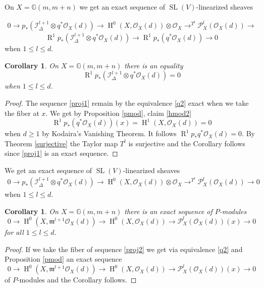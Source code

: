 \documentclass{amsart}
\theoremstyle{plain}
\newtheorem{corollary}[theorem]{Corollary}
\theoremstyle{definition}
\theoremstyle{remark}
\numberwithin{equation}{theorem}
\begin{document}
On $X={\mathbb{G} }(m,m+n)$ we get an exact sequence of ${\operatorname{SL}}(V)$-linearized
sheaves

\begin{align} \label{proj1} 0\rightarrow p_*({\mathcal{I}}_\Delta^{l+1}\otimes
  q^*{\mathcal{O} }_X(d))\rightarrow {\operatorname{H} }^0(X, {\mathcal{O} }_X(d))\otimes {\mathcal{O} }_X \rightarrow^{T^l} {\mathcal{P} }^l_X({\mathcal{O} }_X(d))
\rightarrow \end{align}
\[ {\operatorname{R} }^1p_*({\mathcal{I}}_\Delta^{l+1}\otimes q^*{\mathcal{O} }_X(d)) \rightarrow
{\operatorname{R} }^1p_*(q^*{\mathcal{O} }_X(d)) \rightarrow 0\]
when $1\leq l \leq d$.

\begin{corollary} \label{vanishinggrass} On $X={\mathbb{G} }(m,m+n)$ there is an equality
\[ {\operatorname{R} }^1p_*({\mathcal{I}}_\Delta^{l+1}\otimes q^*{\mathcal{O} }_X(d))=0\]
when $1\leq l \leq d$.
\end{corollary}
\begin{proof} The sequence \ref{proj1} remain by the equivalence
  \ref{q2} exact when we take the fiber at $x$. We get by Proposition
  \ref{pmod}, claim \ref{hmod2}
\[ {\operatorname{R} }^1p_*(q^*{\mathcal{O} }_X(d))(x)={\operatorname{H} }^1(X,{\mathcal{O} }_X(d))=0 \]
when $d\geq 1$ by Kodaira's Vanishing Theorem. It follows ${\operatorname{R} }^1p_*q^*{\mathcal{O} }_X(d)=0$.
By Theorem \ref{surjective}
the Taylor map $T^l$ is surjective and the Corollary follows since
\ref{proj1} is an exact sequence.
\end{proof}

We get an exact sequence of ${\operatorname{SL}}(V)$-linearized sheaves
\begin{align} \label{proj2} 0\rightarrow p_*({\mathcal{I}}_\Delta^{l+1}\otimes
  q^*{\mathcal{O} }_X(d))\rightarrow {\operatorname{H} }^0(X, {\mathcal{O} }_X(d))\otimes {\mathcal{O} }_X
  \rightarrow^{T^l} {\mathcal{P} }^l_X({\mathcal{O} }_X(d))
\rightarrow 0 \end{align}
when $1\leq l \leq d$.

\begin{corollary} \label{pmod1} On $X={\mathbb{G} }(m,m+n)$ there is an exact sequence of
$P$-modules
\[ 0\rightarrow {\operatorname{H} }^0(X,{\mathfrak{m}}^{l+1}{\mathcal{O} }_X(d))\rightarrow
{\operatorname{H} }^0(X,{\mathcal{O} }_X(d))\rightarrow {\mathcal{P} }^l_X({\mathcal{O} }_X(d))(x)\rightarrow 0 \]
for all $1\leq l \leq d$.
\end{corollary}
\begin{proof} If we take the fiber of sequence \ref{proj2} we get via
  equivalence \ref{q2} and Proposition \ref{pmod} an exact sequence
\[ 0\rightarrow {\operatorname{H} }^0(X,{\mathfrak{m}}^{l+1}{\mathcal{O} }_X(d))\rightarrow
{\operatorname{H} }^0(X,{\mathcal{O} }_X(d))\rightarrow {\mathcal{P} }^l_X({\mathcal{O} }_X(d))(x)\rightarrow 0 \]
of $P$-modules and the Corollary follows.
\end{proof}
\end{document}
